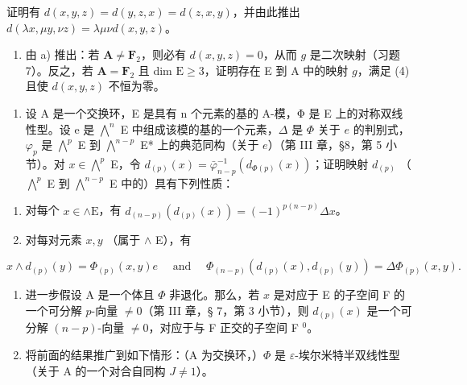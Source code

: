 证明有 \(d(x,y,z)=d(y,z,x)=d(z,x,y)\)，并由此推出 \(d(\lambda x,\mu y,\nu z)=\lambda\mu\nu d(x,y,z)\)。

\begin{enumerate}
\def\labelenumi{\alph{enumi})}
\setcounter{enumi}{1}
\tightlist
\item
  由 a) 推出：若 \(\mathbf{A} \neq \mathbf{F}_2\)，则必有 \(d(x, y, z) = 0\)，从而 \(g\) 是二次映射（习题 7）。反之，若 \(\mathbf{A} = \mathbf{F}_2\) 且 dim \(\mathrm{E} \geqslant 3\)，证明存在 E 到 A 中的映射 \(g\)，满足 (4) 且使 \(d(x, y, z)\) 不恒为零。
\end{enumerate}

\begin{enumerate}
\def\labelenumi{\arabic{enumi})}
\setcounter{enumi}{8}
\tightlist
\item
  设 A 是一个交换环，E 是具有 n 个元素的基的 A-模，Φ 是 E 上的对称双线性型。设 e 是 \(\bigwedge^{n}\) E 中组成该模的基的一个元素，\(\Delta\) 是 \(\Phi\) 关于 \(e\) 的判别式，\(\varphi_{p}\) 是 \(\bigwedge^{p}\) E 到 \(\bigwedge^{n-p}\) E* 上的典范同构（关于 \(e\)）（第 III 章，§8，第 5 小节）。对 \(x \in \bigwedge^{p}\) E，令 \(d_{(p)}(x) = \bar{\varphi}_{n-p}^{-1}(d_{\Phi(p)}(x))\)；证明映射 \(d_{(p)}\) （\(\bigwedge^{p}\) E 到 \(\bigwedge^{n-p}\) E 中的）具有下列性质：
\end{enumerate}

\begin{enumerate}
\def\labelenumi{\alph{enumi})}
\item
  对每个 \(x \in \wedge \mathrm{E}\)，有 \(d_{(n - p)}(d_{(p)}(x)) = (-1)^{p(n - p)}\Delta x\)。
\item
  对每对元素 \(x, y\) （属于 \(\wedge\) E），有
\end{enumerate}

\[
x \wedge d _ {(p)} (y) = \Phi_ {(p)} (x, y) e \quad \text { and } \quad \Phi_ {(n - p)} (d _ {(p)} (x), d _ {(p)} (y)) = \Delta \Phi_ {(p)} (x, y).
\]

\begin{enumerate}
\def\labelenumi{\alph{enumi})}
\setcounter{enumi}{2}
\item
  进一步假设 A 是一个体且 \(\Phi\) 非退化。那么，若 \(x\) 是对应于 E 的子空间 F 的一个可分解 \(p\)-向量 \(\neq 0\)（第 III 章，§ 7，第 3 小节），则 \(d_{(p)}(x)\) 是一个可分解 \((n-p)\)-向量 \(\neq 0\)，对应于与 F 正交的子空间 F \(^{0}\)。
\item
  将前面的结果推广到如下情形：（A 为交换环，）\(\Phi\) 是 \(\varepsilon\)-埃尔米特半双线性型（关于 A 的一个对合自同构 \(J \neq 1\)）。
\end{enumerate}

